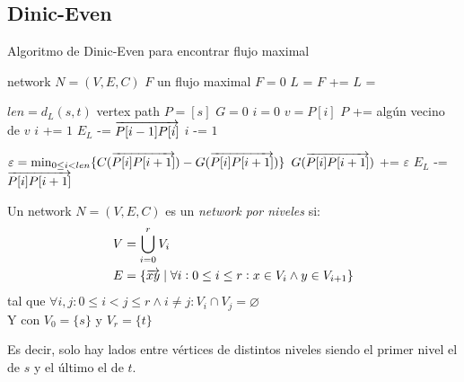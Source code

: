 \subsection{Dinic-Even}

\begin{algorithm}
\caption{Algoritmo de Dinic-Even para encontrar flujo maximal}
\begin{algorithmic}
\Require network $N=(V,E,C)$
\Ensure  $F$ un flujo maximal
\State $F = 0$
\State $L$ =  
    \State $F$ += 
    \State $L$ = 
\EndWhile
\State {}
\EndFunction

\State

\State $len = d_L(s,t)$
\State vertex path $P = [s]$
\State $G = 0$ 
    \State $i = 0$
            \State $v = P[i]$
                \State $P$ += algún vecino de $v$
                \State $i$ += $1$
                \State $E_L$ -= $\overrightarrow{P[i-1] P[i]}$
                \State $i$ -= $1$
            \Else
                \State {} 
            \EndIf
        \EndWhile
    
        \State $\varepsilon = \min_{0\le i < len} \{ C(\overrightarrow{P[i] P[i+1]}) - G(\overrightarrow{P[i] P[i+1]})\}$
            \State $G(\overrightarrow{P[i] P[i+1]})$ += $\varepsilon$
                \State $E_L$ -= $\overrightarrow{P[i] P[i+1]}$
            \EndIf
        \EndFor
    \EndWhile
\EndFunction
\end{algorithmic}
\end{algorithm}

\begin{definition}
Un network $N = (V,E,C)$ es un \emph{network por niveles} si:
\begin{align}
 V &= \bigcup_{i=0}^r V_i \\
 E &= \{\overrightarrow{xy} \mid \forall i: 0 \le i \le r : x \in V_i \wedge y \in V_{i+1}\}
 \end{align}
 tal que $\forall i, j : 0 \le i < j \le r \wedge i \neq j : V_i \cap V_j = \varnothing$ \\
Y con $V_0 = \{s\} \text{ y } V_r = \{t\}$

Es decir, solo hay lados entre vértices de distintos niveles siendo el primer nivel el de $s$ y el último el de $t$.
\end{definition}

